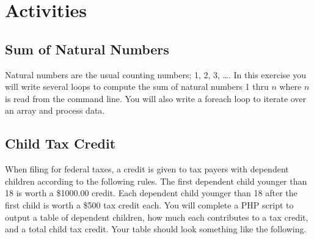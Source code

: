 \documentclass[12pt]{scrartcl}
\begin{document}
\section*{Activities}

\subsection*{Sum of Natural Numbers}

Natural numbers are the usual counting numbers; 1, 2, 3, \ldots.  In 
this exercise you will write several loops to compute the sum of 
natural numbers 1 thru $n$ where $n$ is read from the command line.  
You will also write a foreach loop to iterate over an array and 
process data.

	
\subsection*{Child Tax Credit}

When filing for federal taxes, a credit is given to tax payers 
with dependent children according to the following rules.  The 
first dependent child younger than 18 is worth a \$1000.00 credit.  
Each dependent child younger than 18 after the first child is 
worth a \$500 tax credit each.  You will complete a PHP script 
to output a table of dependent children, how much each contributes 
to a tax credit, and a total child tax credit.  Your table should 
look something like the following.
\end{document}

